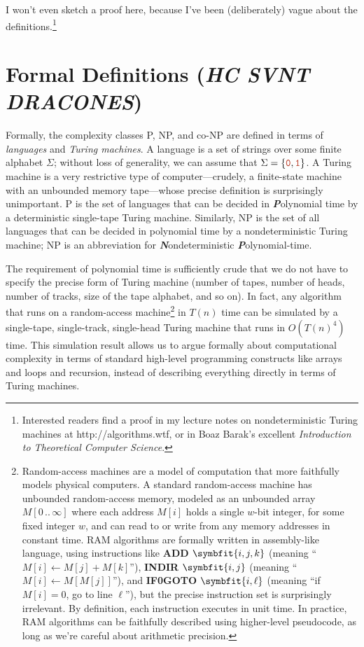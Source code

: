 I won’t even sketch a proof here, because I’ve been (deliberately) vague about the definitions.\footnote{Interested readers find a proof in my lecture notes on nondeterministic Turing machines at http://algorithms.wtf, or in Boaz Barak’s excellent \textit{Introduction to Theoretical Computer Science}.}

\section{Formal Definitions (\textit{HC SVNT DRACONES})}
\label{sec:12.4}

Formally, the complexity classes P, NP, and co-NP are defined in terms of \textit{languages} and \textit{Turing machines}.
A language is a set of strings over some finite alphabet $\Sigma$; without loss of generality, we can assume that $\Sigma = \{\mbox{\Str{0}}, \mbox{\Str{1}}\}$.
A Turing machine is a very restrictive type of computer---crudely, a finite-state machine with an unbounded memory tape---whose precise definition is surprisingly unimportant.
P is the set of languages that can be decided in \textbf{\textit{P}}olynomial time by a deterministic single-tape Turing machine.
Similarly, NP is the set of all languages that can be decided in polynomial time by a nondeterministic Turing machine; NP is an abbreviation for \textbf{\textit{N}}ondeterministic \textbf{\textit{P}}olynomial-time.

The requirement of polynomial time is sufficiently crude that we do not have to specify the precise form of Turing machine (number of tapes, number of heads, number of tracks, size of the tape alphabet, and so on).
In fact, any algorithm that runs on a random-access machine\footnote{Random-access machines are a model of computation that more faithfully models physical computers. A standard random-access machine has unbounded random-access memory, modeled as an unbounded array $M[0\,..\,\infty]$ where each address $M[i]$ holds a single $w$-bit integer, for some fixed integer $w$, and can read to or write from any memory addresses in constant time. RAM algorithms are formally written in assembly-like language, using instructions like {\ttfamily\bfseries ADD} $\symbfit{i, j, k}$ (meaning “$M[i] \gets M[j] + M[k]$”), {\ttfamily\bfseries INDIR} $\symbfit{i, j}$ (meaning “$M[i] \gets M[M[j]]$”), and {\ttfamily\bfseries IF0GOTO} $\symbfit{i, \ell}$ (meaning “if $M[i] = 0$, go to line $\ell$”), but the precise instruction set is surprisingly irrelevant. By definition, each instruction executes in unit time. In practice, RAM algorithms can be faithfully described using higher-level pseudocode, as long as we’re careful about arithmetic precision.} in $T(n)$ time can be simulated by a single-tape, single-track, single-head Turing machine that runs in $O(T(n)^4)$ time.
This simulation result allows us to argue formally about computational complexity in terms of standard high-level programming constructs like arrays and loops and recursion, instead of describing everything directly in terms of Turing machines.

